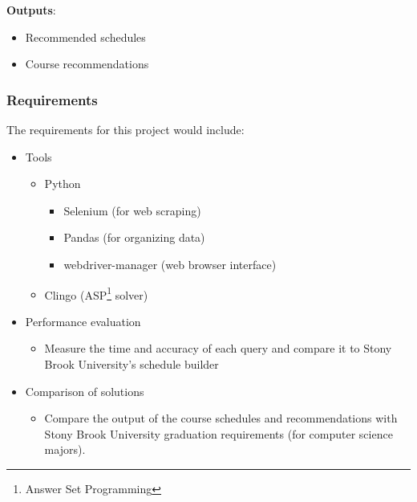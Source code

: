 \documentclass[12pt]{article}
\begin{document}
    \textbf{Outputs}:

    \begin{itemize}
        \label{items:outputs}
        \item Recommended schedules
        \item Course recommendations
    \end{itemize}

    \subsubsection{Requirements}
    \label{subsubsec:reqs}
    The requirements for this project would include:

    \begin{itemize}
        \item Tools
        \begin{itemize}
            \item Python
            \begin{itemize}
                \item Selenium (for web scraping)
                \item Pandas\cite{pandas} (for organizing data)
                \item webdriver-manager (web browser interface)
            \end{itemize}
            \item Clingo (ASP\footnote{Answer Set Programming} solver)\cite{clingo}
        \end{itemize}
        \item Performance evaluation
            \begin{itemize}
                \item Measure the time and accuracy of each query and compare it to Stony Brook University's schedule builder\cite{sched}
            \end{itemize}
        \item Comparison of solutions
            \begin{itemize}
                \item Compare the output of the course schedules and recommendations with Stony Brook University graduation requirements (for computer science majors).
            \end{itemize}
    \end{itemize}
    
\end{document}
